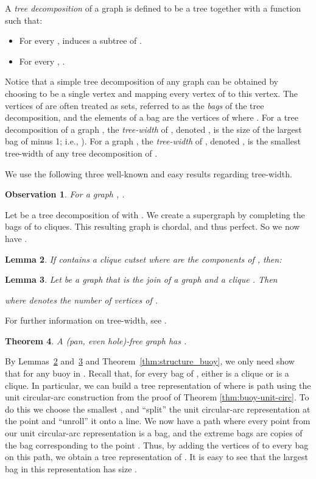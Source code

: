 \documentclass[11pt,a4paper]{article}
\newtheorem{theorem} {Theorem}[section]
\newtheorem{lemma}[theorem]{Lemma}
\newtheorem{observation}[theorem]{Observation}
\newenvironment{proof}{\noindent {\it Proof:~}}{\hfill \smallskip\par}
\begin{document}
A \emph{tree decomposition}  of a graph  is defined to
be a tree  together with a function  such that:
\begin{itemize}
\item For every ,  induces a subtree of .
\item For every , .
\end{itemize}
Notice that a simple tree decomposition of any graph can be
obtained by choosing  to be a single vertex and mapping every
vertex of  to this vertex. The vertices of  are often
treated as sets, referred to as the \emph{bags} of the tree
decomposition, and the elements of a bag  are the vertices 
of  where . For a tree decomposition  of a
graph , the \emph{tree-width} of , denoted , is
the size of the largest bag of  minus 1; i.e., ). For a graph , the \emph{tree-width} of ,
denoted , is the smallest tree-width of any tree
decomposition of .

We use the following three well-known  and easy results regarding
tree-width.

\begin{observation}\label{obs:tw-chi}
For a graph , .
\end{observation}
\begin{proof}
Let  be a tree decomposition of  with .
We create a supergraph  by completing the bags of  to
cliques. This resulting graph is chordal, and thus perfect. So we now
have .
\end{proof}

\begin{lemma}\label{lem:tw-cliquedecomp}
If  contains a clique cutset  where  are
the components of , then:

\end{lemma}

\begin{lemma}\label{lem:tw-join}
Let  be a graph that is the join of a graph  and a clique . Then

where  denotes the number of vertices of .
\end{lemma}

For further information on tree-width, see \cite{Reed}.

\begin{theorem}\label{thm:tw}
A (pan, even hole)-free graph  has .
\end{theorem}
\begin{proof}
By Lemmas~\ref{lem:tw-cliquedecomp} and~\ref{lem:tw-join} and
Theorem~\ref{thm:structure_buoy}, we only need  show that  for any buoy in . Recall that, for every bag
 of , either  is a clique or 
is a clique. In particular, we can build a tree representation
 of  where  is path using the unit circular-arc
construction from the proof of Theorem \ref{thm:buoy-unit-circ}.
To do this we choose the smallest , and ``split'' the unit
circular-arc representation at the point  and ``unroll'' it
onto a line. We now have a path where every point from our unit
circular-arc representation is a bag, and the extreme bags are
copies of the bag corresponding to the point . Thus, by
adding the vertices of  to every bag on this path, we obtain
a tree representation of . It is easy to see that the largest
bag in this representation has size .
\end{proof}
\end{document}
